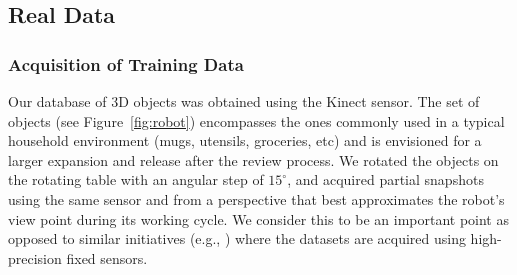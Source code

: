 \documentclass[conference]{sty/IEEEtran}
\begin{document}
\subsection{Real Data}
\subsubsection{Acquisition of Training Data}
Our database of 3D objects was obtained using the Kinect sensor.
The set of objects (see Figure~\ref{fig:robot}) encompasses the ones commonly used
in a typical household environment (mugs, utensils, groceries, etc) and is envisioned for a
larger expansion and release after the review process.  We rotated the objects on the rotating table with
an angular step of $15^\circ$, and acquired partial
snapshots using the same sensor and from a perspective that best
approximates the robot's view point during its working cycle.  We consider
this to be an important point as opposed to similar initiatives (e.g.,
\cite{kit}) where the datasets are acquired using high-precision fixed sensors.

\end{document}
